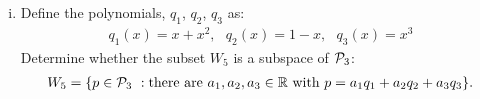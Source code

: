\begin{question}
\begin{enumerate}[(i)]
        \vspace{.6cm}


        \item Define the polynomials, $q_1$, $q_2$, $q_3$ as:
        \begin{align*}
            q_1(x) = x+x^2,\ \ \ q_2(x) = 1-x,\ \ \ q_3(x) = x^3
        \end{align*}
        Determine whether the subset $W_5$  is a subspace of $\P_3$:
        \begin{align*}
            W_5 = \{ p\in\P_3\ : \text{there are}\ a_1,a_2,a_3\in\real\ \text{with}\ p=a_1 q_1 + a_2 q_2 + a_3 q_3 \}.
        \end{align*}

    \end{enumerate}
\end{question}

